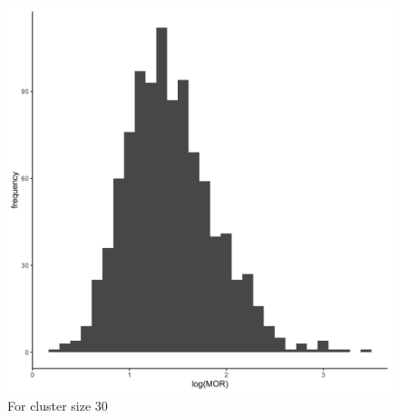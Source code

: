 \documentclass[
  letterpaper,
  DIV=11,
  numbers=noendperiod,
  titlepage]{scrartcl}
\begin{document}
\begin{figure}
\begin{minipage}[t]{0.50\linewidth}
{{\includegraphics{../../plots/two-lvl-ran-int/low-prev/hist_10_30_two_lvl_low_prev.png}

}

\caption{For cluster size 30}

}

\end{minipage}%
%
\begin{minipage}[t]{0.50\linewidth}

{\centering 

}
\end{minipage}
\end{figure}
\end{document}

